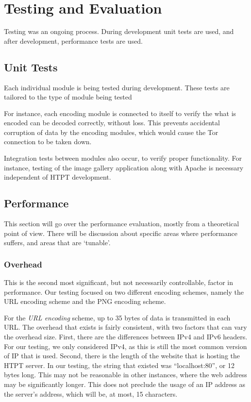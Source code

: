 \section{Testing and Evaluation}

Testing was an ongoing process. During development unit tests are used, and after development, performance tests are used. 

\subsection{Unit Tests}
Each individual module is being tested during development. These tests are tailored to the type of module being tested

For instance, each encoding module is connected to itself to verify the what is encoded can be decoded correctly, without loss. This prevents accidental corruption of data by the encoding modules, which would cause the Tor connection to be taken down.

Integration tests between modules also occur, to verify proper functionality. For instance, testing of the image gallery application along with Apache is necessary independent of HTPT development. 

\subsection{Performance}

This section will go over the performance evaluation, mostly from a theoretical point of view. There will be discussion about specific areas where performance suffers, and areas that are `tunable'.

\subsubsection{Overhead}
This is the second most significant, but not necessarily controllable, factor in performance. Our testing focused on two different encoding schemes, namely the URL encoding scheme and the PNG encoding scheme.

For the \emph{URL encoding} scheme, up to 35 bytes of data is transmitted in each URL. The overhead that exists is fairly consistent, with two factors that can vary the overhead size. First, there are the differences between IPv4 and IPv6 headers. For our testing, we only considered IPv4, as this is still the most common version of IP that is used. Second, there is the length of the website that is hosting the HTPT server. In our testing, the string that existed was ``localhost:80'', or 12 bytes long. This may not be reasonable in other instances, where the web address may be significantly longer. This does not preclude the usage of an IP address as the server's address, which will be, at most, 15 characters. 

